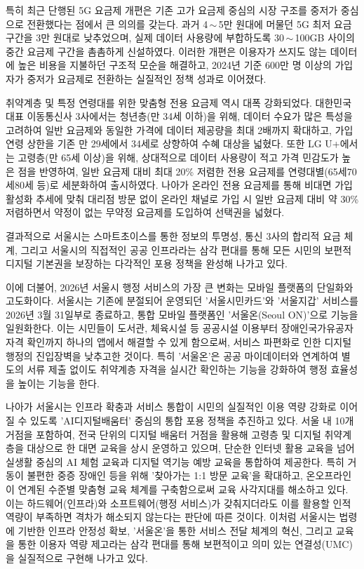 특히 최근 단행된 5G 요금제 개편은 기존 고가 요금제 중심의 시장 구조를 중저가 중심으로 전환했다는 점에서 큰 의의를 갖는다. 과거 4\,$\sim$\,5만 원대에 머물던 5G 최저 요금 구간을 3만 원대로 낮추었으며, 실제 데이터 사용량에 부합하도록 30\,$\sim$\,100GB 사이의 중간 요금제 구간을 촘촘하게 신설하였다. 이러한 개편은 이용자가 쓰지도 않는 데이터에 높은 비용을 지불하던 구조적 모순을 해결하고, 2024년 기준 600만 명 이상의 가입자가 중저가 요금제로 전환하는 실질적인 정책 성과로 이어졌다.

취약계층 및 특정 연령대를 위한 맞춤형 전용 요금제 역시 대폭 강화되었다. 대한민국 대표 이동통신사 3사에서는 청년층(만 34세 이하)을 위해, 데이터 수요가 많은 특성을 고려하여 일반 요금제와 동일한 가격에 데이터 제공량을 최대 2배까지 확대하고, 가입 연령 상한을 기존 만 29세에서 34세로 상향하여 수혜 대상을 넓혔다. 또한 LG U+에서는 고령층(만 65세 이상)을 위해, 상대적으로 데이터 사용량이 적고 가격 민감도가 높은 점을 반영하여, 일반 요금제 대비 최대 20\% 저렴한 전용 요금제를 연령대별(65세\textperiodcentered{}70세\textperiodcentered{}80세 등)로 세분화하여 출시하였다. 나아가 온라인 전용 요금제를 통해 비대면 가입 활성화 추세에 맞춰 대리점 방문 없이 온라인 채널로 가입 시 일반 요금제 대비 약 30\% 저렴하면서 약정이 없는 무약정 요금제를 도입하여 선택권을 넓혔다.

결과적으로 서울시는 스마트초이스를 통한 정보의 투명성, 통신 3사의 합리적 요금 체계, 그리고 서울시의 직접적인 공공 인프라라는 삼각 편대를 통해 모든 시민의 보편적 디지털 기본권을 보장하는 다각적인 포용 정책을 완성해 나가고 있다.

이에 더불어, 2026년 서울시 행정 서비스의 가장 큰 변화는 모바일 플랫폼의 단일화와 고도화이다. 서울시는 기존에 분절되어 운영되던 '서울시민카드'와 '서울지갑' 서비스를 2026년 3월 31일부로 종료하고, 통합 모바일 플랫폼인 '서울온(Seoul ON)'으로 기능을 일원화한다. 이는 시민들이 도서관, 체육시설 등 공공시설 이용부터 장애인\textperiodcentered{}국가유공자 자격 확인까지 하나의 앱에서 해결할 수 있게 함으로써, 서비스 파편화로 인한 디지털 행정의 진입장벽을 낮추고한 것이다. 특히 '서울온'은 공공 마이데이터와 연계하여 별도의 서류 제출 없이도 취약계층 자격을 실시간 확인하는 기능을 강화하여 행정 효율성을 높이는 기능을 한다.

나아가 서울시는 인프라 확충과 서비스 통합이 시민의 실질적인 이용 역량 강화로 이어질 수 있도록 'AI디지털배움터' 중심의 통합 포용 정책을 추진하고 있다. 서울 내 10개 거점을 포함하여, 전국 단위의 디지털 배움터 거점을 활용해 고령층 및 디지털 취약계층을 대상으로 한 대면 교육을 상시 운영하고 있으며, 단순한 인터넷 활용 교육을 넘어 실생활 중심의 AI 체험 교육과 디지털 역기능 예방 교육을 통합하여 제공한다. 특히 거동이 불편한 중증 장애인 등을 위해 '찾아가는 1:1 방문 교육'을 확대하고, 온\textperiodcentered{}오프라인이 연계된 수준별 맞춤형 교육 체계를 구축함으로써 교육 사각지대를 해소하고 있다. 이는 하드웨어(인프라)와 소프트웨어(행정 서비스)가 갖춰지더라도 이를 활용할 인적 역량이 부족하면 격차가 해소되지 않는다는 판단에 따른 것이다. 이처럼 서울시는 법령에 기반한 인프라 안정성 확보, '서울온'을 통한 서비스 전달 체계의 혁신, 그리고 교육을 통한 이용자 역량 제고라는 삼각 편대를 통해 보편적이고 의미 있는 연결성(UMC)을 실질적으로 구현해 나가고 있다.
